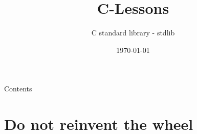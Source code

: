


\title{C-Lessons}
\subtitle{C standard library - stdlib}
\date{\today}

\usetikzlibrary{tikzmark}


\newcommand{\tikzgraphic}[2]{
\begin{tikzpicture}[scale=#1,font=#2]
	\node (main) [rectangle,draw,inner sep=1em] at (0,0){main.c};
	\node (libc) [rectangle,draw,inner sep=1em] at (5,-3){libc.so};
	\node (stdio) [rectangle,draw,inner sep=1em] at (5,0){stdio.h};
	\node (maino) [rectangle,draw,inner sep=1em] at (0,-3){main.o};
	\node (aout) [rectangle,draw,inner sep=1em] at (2.5,-5){a.out};
	\node at (aout) [above=1.5em] {linking};
	\draw[->] (main) -- (maino) node [left,align=right,midway,text width=5em] {compiling, assembling};
	\draw[->,dotted] (main) -- (stdio) node [above,midway] {includes};
	\draw[->,dotted] (stdio) -- (libc) node [right,midway] {implementation};
	\draw[->] (libc) -- (aout);
	\draw[->] (maino) -- (aout);
\end{tikzpicture}
}



\maketitle


\begin{frame}{Contents}
	\tableofcontents
\end{frame}

\section{Do not reinvent the wheel}

